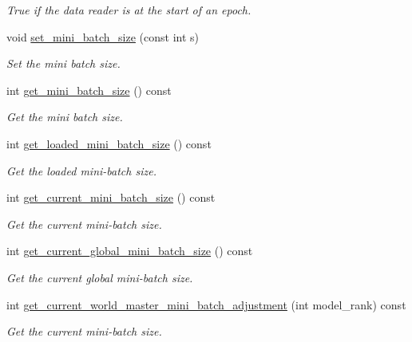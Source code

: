 \begin{DoxyCompactItemize}
\begin{DoxyCompactList}\small\item\em True if the data reader is at the start of an epoch. \end{DoxyCompactList}\item 
void \hyperlink{classlbann_1_1generic__data__reader_adf161cca4b80eb95f9748050e7fe1809}{set\+\_\+mini\+\_\+batch\+\_\+size} (const int s)
\begin{DoxyCompactList}\small\item\em Set the mini batch size. \end{DoxyCompactList}\item 
int \hyperlink{classlbann_1_1generic__data__reader_af85a5ea421ba6ef7558cdf4bba36fdf0}{get\+\_\+mini\+\_\+batch\+\_\+size} () const
\begin{DoxyCompactList}\small\item\em Get the mini batch size. \end{DoxyCompactList}\item 
int \hyperlink{classlbann_1_1generic__data__reader_a850e99110dd1e9df2985f09ea196fea8}{get\+\_\+loaded\+\_\+mini\+\_\+batch\+\_\+size} () const
\begin{DoxyCompactList}\small\item\em Get the loaded mini-\/batch size. \end{DoxyCompactList}\item 
int \hyperlink{classlbann_1_1generic__data__reader_aec4624f295e1e3c6c5053838624441a5}{get\+\_\+current\+\_\+mini\+\_\+batch\+\_\+size} () const
\begin{DoxyCompactList}\small\item\em Get the current mini-\/batch size. \end{DoxyCompactList}\item 
int \hyperlink{classlbann_1_1generic__data__reader_a3f7114448c6b43a5aac30c002e4bade3}{get\+\_\+current\+\_\+global\+\_\+mini\+\_\+batch\+\_\+size} () const
\begin{DoxyCompactList}\small\item\em Get the current global mini-\/batch size. \end{DoxyCompactList}\item 
int \hyperlink{classlbann_1_1generic__data__reader_af80711baa226f8bc370e8e276c49f3c1}{get\+\_\+current\+\_\+world\+\_\+master\+\_\+mini\+\_\+batch\+\_\+adjustment} (int model\+\_\+rank) const
\begin{DoxyCompactList}\small\item\em Get the current mini-\/batch size. \end{DoxyCompactList}\item 

\end{DoxyCompactItemize}
